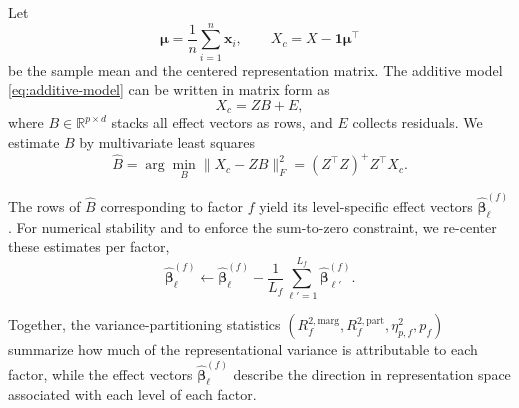 Let
\begin{equation}
    \boldsymbol{\mu} = \frac{1}{n} \sum_{i=1}^n \mathbf{x}_i, \qquad
    X_c = X - \mathbf{1}\boldsymbol{\mu}^\top
\end{equation}
be the sample mean and the centered representation matrix. The additive model
\eqref{eq:additive-model} can be written in matrix form as
\begin{equation}
    X_c = Z B + E,
\end{equation}
where $B \in \mathbb{R}^{p \times d}$ stacks all effect vectors as rows, and $E$ collects residuals. We estimate $B$ by multivariate least squares
\begin{equation}
    \hat{B} = \arg\min_{B} \lVert X_c - Z B \rVert_F^2
    = (Z^\top Z)^+ Z^\top X_c.
\end{equation}

The rows of $\hat{B}$ corresponding to factor $f$ yield its level-specific effect vectors
$\hat{\boldsymbol{\beta}}^{(f)}_\ell$. For numerical stability and to enforce the sum-to-zero constraint, we re-center these estimates per factor,
\begin{equation}
    \hat{\boldsymbol{\beta}}^{(f)}_\ell \leftarrow 
    \hat{\boldsymbol{\beta}}^{(f)}_\ell
    - \frac{1}{L_f} \sum_{\ell'=1}^{L_f} \hat{\boldsymbol{\beta}}^{(f)}_{\ell'}.
\end{equation}

Together, the variance-partitioning statistics $(R_f^{2,\text{marg}}, R_f^{2,\text{part}}, \eta_{p,f}^2, p_f)$ summarize how much of the representational variance is attributable to each factor, while the effect vectors $\hat{\boldsymbol{\beta}}^{(f)}_\ell$ describe the direction in representation space associated with each level of each factor.

\begin{table}[t]
\centering
\caption{\textbf{Example Variance partitioning results for representational factors of T5 contextual word vector}. 
The model achieves a total explained variance of $R^2_{\text{total}} = 0.7486$.}
\label{tab:varpart}
\end{table}


